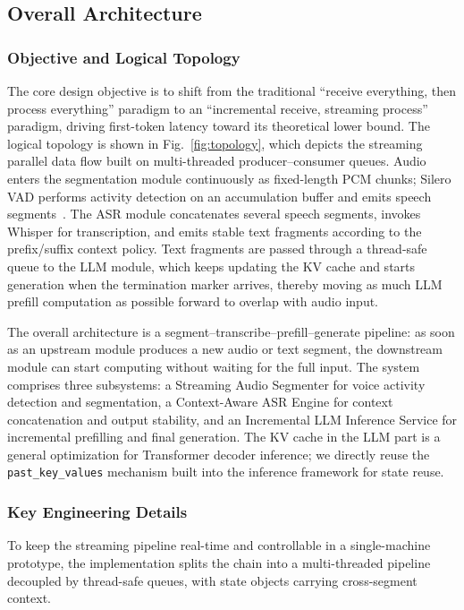 \documentclass[conference]{IEEEtran}
\begin{document}
\subsection{Overall Architecture}

\subsubsection{Objective and Logical Topology}

The core design objective is to shift from the traditional ``receive everything, then process everything'' paradigm to an ``incremental receive, streaming process'' paradigm, driving first-token latency toward its theoretical lower bound. The logical topology is shown in Fig.~\ref{fig:topology}, which depicts the streaming parallel data flow built on multi-threaded producer--consumer queues. Audio enters the segmentation module continuously as fixed-length PCM chunks; Silero VAD performs activity detection on an accumulation buffer and emits speech segments~\cite{ref13}. The ASR module concatenates several speech segments, invokes Whisper for transcription, and emits stable text fragments according to the prefix/suffix context policy. Text fragments are passed through a thread-safe queue to the LLM module, which keeps updating the KV cache and starts generation when the termination marker arrives, thereby moving as much LLM prefill computation as possible forward to overlap with audio input.

The overall architecture is a segment--transcribe--prefill--generate pipeline: as soon as an upstream module produces a new audio or text segment, the downstream module can start computing without waiting for the full input. The system comprises three subsystems: a Streaming Audio Segmenter for voice activity detection and segmentation, a Context-Aware ASR Engine for context concatenation and output stability, and an Incremental LLM Inference Service for incremental prefilling and final generation. The KV cache in the LLM part is a general optimization for Transformer decoder inference; we directly reuse the \texttt{past\_key\_values} mechanism built into the inference framework for state reuse.

\subsubsection{Key Engineering Details}

To keep the streaming pipeline real-time and controllable in a single-machine prototype, the implementation splits the chain into a multi-threaded pipeline decoupled by thread-safe queues, with state objects carrying cross-segment context.
\end{document}
